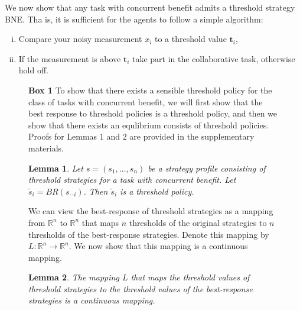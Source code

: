 \documentclass{nature}
\newtheorem{lemma}{Lemma}
\def\R{\mathbb{R}}    %
\def\td{\mathbf{t}}   %
\begin{document}
We now show that any task with  concurrent benefit admits a threshold strategy BNE. Tha is, it is sufficient for the agents to follow a simple algorithm: 
\begin{enumerate}[(i)]
\item Compare your noisy measurement $x_i$ to a threshold value $\td_i$,
\item If the measurement is above $\td_i$ take part in the collaborative task, otherwise hold off.
\end{enumerate}


\nolinenumbers
\begin{figure}
\begin{framed}
\textbf{Box 1}
To show that there exists a sensible threshold policy for the class of tasks with concurrent benefit, we will first show that the best response to threshold policies is a threshold policy, and then we show that there exists an equlibrium consists of threshold policies\cite{Carlsson1993, Morris2000}. Proofs for Lemmas 1 and 2 are provided in the supplementary materials.
\begin{lemma}\label{lemma:thresholdBR}
Let $s=(s_1,\ldots,s_n)$ be a strategy profile consisting of threshold strategies for a task with  concurrent benefit. Let $\tilde{s}_i=BR(s_{-i})$. Then $\tilde{s}_i$ is a threshold policy. 
\end{lemma} 

We can view the best-response of threshold strategies as a mapping from $\R^n$ to $\R^n$ that maps $n$ thresholds of the original strategies to $n$ thresholds of the best-response strategies. Denote this mapping by $L:\R^n\to\R^n$. We now show that this mapping is a continuous mapping.

\begin{lemma}\label{lemma:continuous}
The mapping $L$ that maps the threshold values of threshold strategies to the threshold values of the best-response strategies is a continuous mapping. 
\end{lemma}


\end{framed}
\end{figure}
\end{document}

